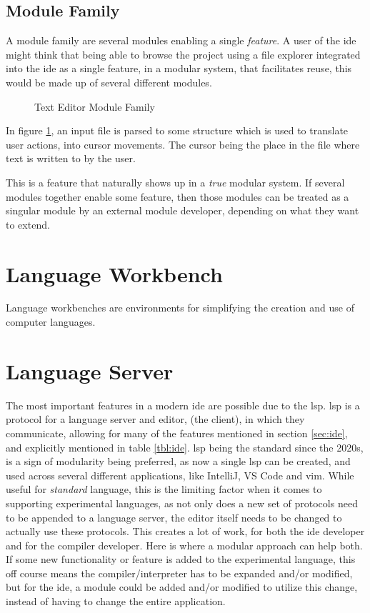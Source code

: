\subsection{Module Family}

A module family are several modules enabling a single
\textit{feature}. A user of the \gls{ide} might think that being able to browse
the project using a file explorer integrated into the \gls{ide} as a single
feature, in a modular system, that facilitates reuse, this would be made up of
several different modules.

\begin{figure}
  \centering
  
  \caption{Text Editor Module Family}
  \label{fig:textEditorSimple}
\end{figure}

In figure \ref{fig:textEditorSimple}, an input file is parsed to some structure
which is used to translate user actions, into cursor movements. The cursor being
the place in the file where text is written to by the user.

This is a feature that naturally shows up in a \textit{true} modular system. If
several modules together enable some feature, then those modules can be treated
as a singular module by an external module developer, depending on what they
want to extend.


\section{Language Workbench}

Language workbenches are environments for simplifying the creation and use of
computer languages. \cite{lwb}


\section{Language Server}

The most important features in a modern \gls{ide} are possible due to the
\gls{lsp}. \gls{lsp} is a protocol for a language server and editor,
(the client), in which they communicate, allowing for many of the features
mentioned in section \ref{sec:ide}, and explicitly mentioned in table
\ref{tbl:ide}. \gls{lsp} being the standard since the 2020s, is a sign of
modularity being preferred, as now a single \gls{lsp} can be created, and used
across several different applications, like IntelliJ, VS Code and \gls{vim}.
While useful for \textit{standard} language, this is the limiting factor when it
comes to supporting experimental languages, as not only does a new set of
protocols need to be appended to a language server, the editor itself needs to
be changed to actually use these protocols. This creates a lot of work, for both
the \gls{ide} developer and for the compiler developer. Here is where a modular
approach can help both. If some new functionality or feature is added to the
experimental language, this off course means the compiler/interpreter has to be
expanded and/or modified, but for the \gls{ide}, a module could be added and/or
modified to utilize this change, instead of having to change the entire
application.

